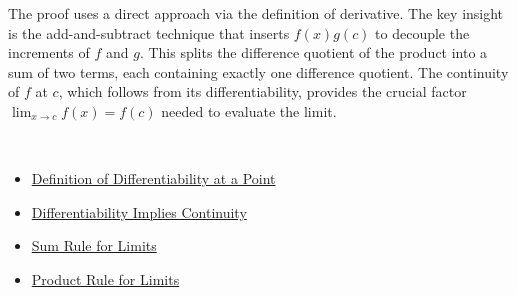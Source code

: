 \begin{remark*}
The proof uses a direct approach via the definition of derivative. The key insight is the add-and-subtract technique that inserts $f(x)g(c)$ to decouple the increments of $f$ and $g$. This splits the difference quotient of the product into a sum of two terms, each containing exactly one difference quotient. The continuity of $f$ at $c$, which follows from its differentiability, provides the crucial factor $\lim_{x \to c} f(x) = f(c)$ needed to evaluate the limit.
\end{remark*}

\begin{remark*}[Dependencies]~\\
\begin{itemize}
  \item \hyperref[def:derivative-at-point]{Definition of Differentiability at a Point}
  \item \hyperref[thm:diff-implies-cont]{Differentiability Implies Continuity}
  \item \hyperref[thm:limit-sum]{Sum Rule for Limits}
  \item \hyperref[thm:limit-product]{Product Rule for Limits}
\end{itemize}
\end{remark*}

\clearpage

